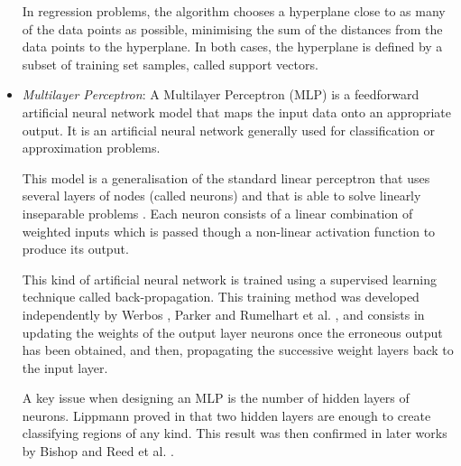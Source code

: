 \documentclass[a4paper,10pt,twocolumn,preprint,3p]{elsarticle}
\begin{document}
\begin{itemize}
In regression problems, the algorithm chooses a hyperplane close to as many 
of the data points as possible, minimising the sum of the distances from 
the data points to the hyperplane. 
In both cases, the hyperplane is defined by a subset of training set samples, 
called support vectors.



 \item \emph{Multilayer Perceptron}:
A Multilayer Perceptron (MLP) \cite{Rosenblatt1962,Widrow1990} is a feedforward 
artificial neural network model that maps the input data onto an appropriate output. 
It is an artificial neural network generally used for classification or 
approximation problems.

This model is a generalisation of the standard linear perceptron that uses several 
layers of nodes (called neurons) and that is able to solve linearly inseparable 
problems \cite{SteinwenderBitzer2003}.
Each neuron consists of a linear combination of weighted inputs which is passed 
though a non-linear activation function to produce its output.

This kind of artificial neural network is trained using a supervised learning 
technique called back-propagation.
This training method was developed independently by Werbos \cite{Werbos1974}, 
Parker \cite{Parker1985} and Rumelhart et al. \cite{Rumelhart1985}, and consists
in updating the weights of the output layer neurons once the erroneous output 
has been obtained, and then, propagating the successive weight layers back to 
the input layer.

A key issue when designing an MLP is the number of hidden layers of neurons.
Lippmann proved in \cite{Lippmann1987} that two hidden layers are enough to 
create classifying regions of any kind. This result was then confirmed in later 
works by Bishop \cite{Bishop1996} and Reed et al. \cite{Reed1999}.


\end{itemize}
\end{document}
